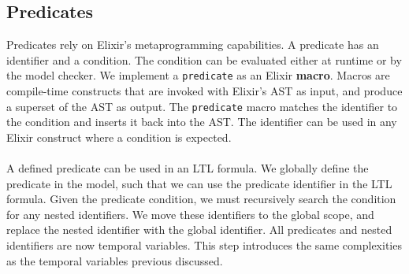 \subsection{Predicates}
Predicates rely on Elixir's metaprogramming capabilities. A predicate has an identifier and a condition. The condition can be evaluated either at runtime or by the model checker. We implement a \texttt{predicate} as an Elixir \textbf{macro}. Macros are compile-time constructs that are invoked with Elixir's AST as input, and produce a superset of the AST as output. The \texttt{predicate} macro matches the identifier to the condition and inserts it back into the AST. The identifier can be used in any Elixir construct where a condition is expected.
\\ \\
A defined predicate can be used in an LTL formula. We globally define the predicate in the model, such that we can use the predicate identifier in the LTL formula. Given the predicate condition, we must recursively search the condition for any nested identifiers. We move these identifiers to the global scope, and replace the nested identifier with the global identifier. All predicates and nested identifiers are now temporal variables. This step introduces the same complexities as the temporal variables previous discussed.
